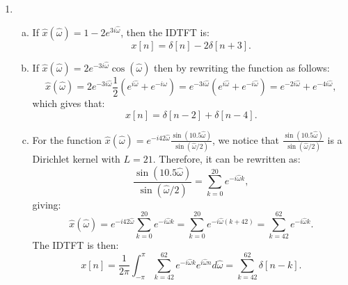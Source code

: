 \begin{enumerate}
  \item

        \begin{enumerate}[a)]
          \item If $\hat{x}(\hat{\omega})=1-2e^{3i\hat{\omega}}$, then the IDTFT is:
                \[ x[n]=\delta[n]-2\delta[n+3]. \]

          \item If $\hat{x}(\hat{\omega})=2e^{-3i\hat{\omega}}\cos(\hat{\omega})$ then by rewriting the function as follows:
                \[ \hat{x}(\hat{\omega})=2e^{-3i\hat{\omega}}\frac{1}{2}(e^{i\hat{\omega}}+e^{-i\hat{\omega}})=e^{-3i\hat{\omega}}(e^{i\hat{\omega}}+e^{-i\hat{\omega}})=e^{-2i\hat{\omega}}+e^{-4i\hat{\omega}}, \]
                which gives that:
                \[ x[n]=\delta[n-2]+\delta[n-4]. \]

          \item For the function $\hat{x}(\hat{\omega})=e^{-i42\hat{\omega}}\frac{\sin(10.5\hat{\omega})}{\sin(\hat{\omega}/2)}$, we notice that $\frac{\sin(10.5\hat{\omega})}{\sin(\hat{\omega}/2)}$ is a Dirichlet kernel with $L=21$. Therefore, it can be rewritten as:
                \[ \frac{\sin(10.5\hat{\omega})}{\sin(\hat{\omega}/2)}=\sum_{k=0}^{20}e^{-i\hat{\omega}k}, \]
                giving:
                \[ \hat{x}(\hat{\omega})=e^{-i42\hat{\omega}}\sum_{k=0}^{20}e^{-i\hat{\omega}k}=\sum_{k=0}^{20}e^{-i\hat{\omega}(k+42)}=\sum_{k=42}^{62}e^{-i\hat{\omega}k}. \]
                The IDTFT is then:
                \[ x[n]=\frac{1}{2\pi}\int_{-\pi}^{\pi}\sum_{k=42}^{62}e^{-i\hat{\omega}k}e^{i\hat{\omega}n}d\hat{\omega} =\sum_{k=42}^{62}\delta[n-k]. \]
        \end{enumerate}









\end{enumerate}